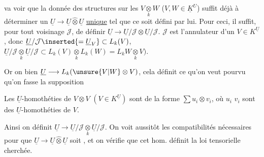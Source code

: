va voir que la donnée des structures  sur les
$V\underset{k}{\otimes}W$ ($V,W\in\underline K^U$) suffit déjà à déterminer
un $\underline U\longrightarrow\underline U\mathbin{\widehat\otimes}\underline U$ \uline{unique} tel que ce soit défini
par lui. Pour ceci, il suffit, pour tout
voisinage $\mathcal J$, de  définir
$\underline U\longrightarrow\underline U/\mathcal J\otimes\underline U/\mathcal J$.  $\mathcal J$ est l'annulateur
d'un $V\in K^{\underline U}$, donc $\underline U/\mathcal J\inserted{={}\underline U_V}\subset L_k(V)$,
$\underline U/\mathcal J\underset{k}{\otimes}\underline U/\mathcal J\subset L_k(V)\underset{k}{\otimes}L_k(W)=L_k W\underset{k}{\otimes}V)$.

 Or on  bien
$\underline U\longrightarrow L_k(\unsure{V|W}\otimes V)$, cela définit ce qu'on veut
pourvu qu'on fasse la supposition

Les $\underline U$-homothéties de $V\otimes V$
$(V\in K^{\underline U})$ sont de la forme $\sum u_i\otimes v_i$,
où $u_i$ $v_i$ sont des $\underline U$-homothéties
de $V$.

Ainsi on définit $\underline U\longrightarrow\underline U/\mathcal J\underset{k}{\otimes}\underline U/\mathcal J$.
On voit aussitôt les compatibilités
nécessaires pour que $\underline U\longrightarrow\underline U\mathbin{\widehat\otimes}\underline U$ soit
, et on vérifie que cet hom.
définit la loi tensorielle cherchée.

